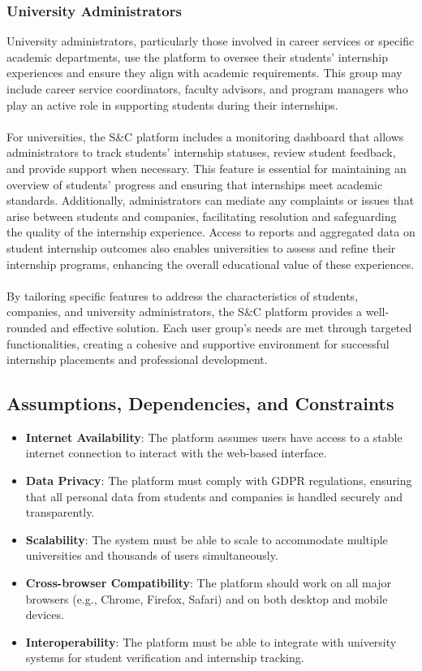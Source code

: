 \subsubsection{University Administrators}
University administrators, particularly those involved in career services or specific academic departments, use the platform to oversee their students’ internship experiences and ensure they align with academic requirements. This group may include career service coordinators, faculty advisors, and program managers who play an active role in supporting students during their internships.\\ \\
For universities, the S\&C platform includes a monitoring dashboard that allows administrators to track students’ internship statuses, review student feedback, and provide support when necessary. This feature is essential for maintaining an overview of students’ progress and ensuring that internships meet academic standards. Additionally, administrators can mediate any complaints or issues that arise between students and companies, facilitating resolution and safeguarding the quality of the internship experience. Access to reports and aggregated data on student internship outcomes also enables universities to assess and refine their internship programs, enhancing the overall educational value of these experiences.
\\ \\
By tailoring specific features to address the characteristics of students, companies, and university administrators, the S\&C platform provides a well-rounded and effective solution. Each user group’s needs are met through targeted functionalities, creating a cohesive and supportive environment for successful internship placements and professional development.



\subsection{Assumptions, Dependencies, and Constraints}
\begin{itemize}
    \item \textbf{Internet Availability}: The platform assumes users have access to a stable internet connection to interact with the web-based interface.
    \item \textbf{Data Privacy}: The platform must comply with GDPR regulations, ensuring that all personal data from students and companies is handled securely and transparently.
    \item \textbf{Scalability}: The system must be able to scale to accommodate multiple universities and thousands of users simultaneously.
    \item \textbf{Cross-browser Compatibility}: The platform should work on all major browsers (e.g., Chrome, Firefox, Safari) and on both desktop and mobile devices.
    \item \textbf{Interoperability}: The platform must be able to integrate with university systems for student verification and internship tracking.
\end{itemize}

